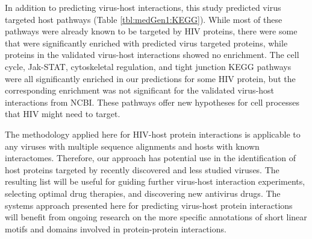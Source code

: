 In addition to predicting virus-host interactions, this study
predicted virus targeted host pathways (Table
\ref{tbl:medGen1:KEGG}). While most of these pathways were already
known to be targeted by HIV proteins, there were some that were
significantly enriched with predicted virus targeted proteins, while
proteins in the validated virus-host interactions showed no
enrichment. The cell cycle, Jak-STAT, cytoskeletal regulation, and
tight junction KEGG pathways were all significantly enriched in our
predictions for some HIV protein, but the corresponding enrichment
was not significant for the validated virus-host interactions from
NCBI. These pathways offer new hypotheses for cell processes that HIV
might need to target.

The methodology applied here for HIV-host protein interactions is
applicable to any viruses with multiple sequence alignments and hosts
with known interactomes. Therefore, our approach has potential use in
the identification of host proteins targeted by recently discovered
and less studied viruses. The resulting list will be useful for
guiding further virus-host interaction experiments, selecting optimal
drug therapies, and discovering new antivirus drugs. The systems
approach presented here for predicting virus-host protein interactions
will benefit from ongoing research on the more specific annotations of
short linear motifs and domains involved in protein-protein
interactions.




